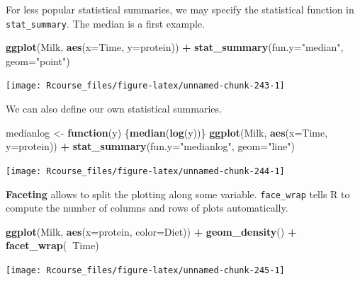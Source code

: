 \documentclass[]{book}
\newenvironment{Shaded}{\begin{snugshade}}{\end{snugshade}}
\newcommand{\KeywordTok}[1]{\textcolor[rgb]{0.13,0.29,0.53}{\textbf{#1}}}
\newcommand{\DataTypeTok}[1]{\textcolor[rgb]{0.13,0.29,0.53}{#1}}
\newcommand{\StringTok}[1]{\textcolor[rgb]{0.31,0.60,0.02}{#1}}
\newcommand{\ControlFlowTok}[1]{\textcolor[rgb]{0.13,0.29,0.53}{\textbf{#1}}}
\newcommand{\OperatorTok}[1]{\textcolor[rgb]{0.81,0.36,0.00}{\textbf{#1}}}
\newcommand{\NormalTok}[1]{#1}
\theoremstyle{definition}
\theoremstyle{definition}
\theoremstyle{definition}
\theoremstyle{remark}
\begin{document}
For less popular statistical summaries, we may specify the statistical
function in \texttt{stat\_summary}. The median is a first example.

\begin{Shaded}
\begin{Highlighting}[]
\KeywordTok{ggplot}\NormalTok{(Milk, }\KeywordTok{aes}\NormalTok{(}\DataTypeTok{x=}\NormalTok{Time, }\DataTypeTok{y=}\NormalTok{protein)) }\OperatorTok{+}
\StringTok{  }\KeywordTok{stat_summary}\NormalTok{(}\DataTypeTok{fun.y=}\StringTok{"median"}\NormalTok{, }\DataTypeTok{geom=}\StringTok{"point"}\NormalTok{)}
\end{Highlighting}
\end{Shaded}

\texttt{[image: Rcourse\_files/figure-latex/unnamed-chunk-243-1]}

We can also define our own statistical summaries.

\begin{Shaded}
\begin{Highlighting}[]
\NormalTok{medianlog <-}\StringTok{ }\ControlFlowTok{function}\NormalTok{(y) \{}\KeywordTok{median}\NormalTok{(}\KeywordTok{log}\NormalTok{(y))\}}
\KeywordTok{ggplot}\NormalTok{(Milk, }\KeywordTok{aes}\NormalTok{(}\DataTypeTok{x=}\NormalTok{Time, }\DataTypeTok{y=}\NormalTok{protein)) }\OperatorTok{+}
\StringTok{  }\KeywordTok{stat_summary}\NormalTok{(}\DataTypeTok{fun.y=}\StringTok{"medianlog"}\NormalTok{, }\DataTypeTok{geom=}\StringTok{"line"}\NormalTok{)}
\end{Highlighting}
\end{Shaded}

\texttt{[image: Rcourse\_files/figure-latex/unnamed-chunk-244-1]}

\textbf{Faceting} allows to split the plotting along some variable.
\texttt{face\_wrap} tells R to compute the number of columns and rows of
plots automatically.

\begin{Shaded}
\begin{Highlighting}[]
\KeywordTok{ggplot}\NormalTok{(Milk, }\KeywordTok{aes}\NormalTok{(}\DataTypeTok{x=}\NormalTok{protein, }\DataTypeTok{color=}\NormalTok{Diet)) }\OperatorTok{+}
\StringTok{  }\KeywordTok{geom_density}\NormalTok{() }\OperatorTok{+}
\StringTok{  }\KeywordTok{facet_wrap}\NormalTok{(}\OperatorTok{~}\NormalTok{Time)}
\end{Highlighting}
\end{Shaded}

\texttt{[image: Rcourse\_files/figure-latex/unnamed-chunk-245-1]}
\end{document}
